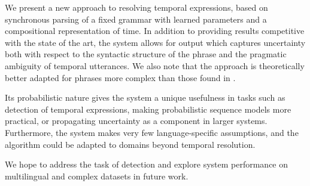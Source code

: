 We present a new approach to resolving temporal expressions,
	based on synchronous parsing of a fixed grammar with learned parameters
	and a compositional representation of time.
In addition to providing results competitive with the state of the art,
	the system allows for output which captures uncertainty both with respect to 
	the syntactic structure of the phrase and the pragmatic ambiguity of 
	temporal utterances.
We also note that the approach is theoretically better adapted for
	phrases more complex than those found in \tempeval.

Its probabilistic nature gives the system a unique usefulness
	in tasks such as detection of temporal expressions, making probabilistic
	sequence models more practical, or propagating uncertainty as a
	component in larger systems.
Furthermore, the system makes very few language-specific assumptions,
	and the algorithm could be adapted to domains beyond temporal resolution.

We hope to address the task of detection and explore system performance
	on multilingual and complex datasets in future work.
